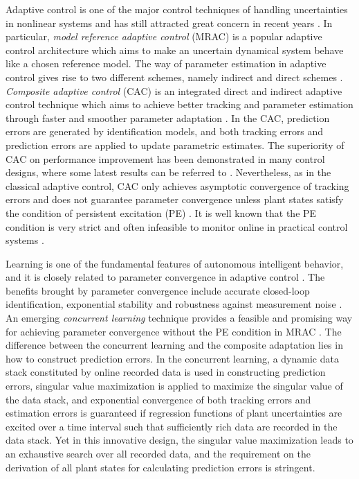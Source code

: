 \documentclass[conference]{IEEEtran}
\begin{document}
Adaptive control is one of the major control techniques of handling uncertainties in nonlinear systems and has still attracted great concern in recent years \cite{Astrom2008, Astolfi2008, Anderson2008, Stefanovic2011, Narendra2011, Casavola2012, Khan2012, Martin2012, Pathak2012, Lavretsky2013, Serrani2013, Sun2013, Barkana2014b, Chan2014, Swarnkar2014, Tao2014}. In particular, \emph{model reference adaptive control} (MRAC) is a popular adaptive control architecture which aims to make an uncertain dynamical system behave like a chosen reference model. The way of parameter estimation in adaptive control gives rise to two different schemes, namely indirect and direct schemes \cite{Ioannou1996}. \emph{Composite adaptive control} (CAC) is an integrated direct and indirect adaptive control technique which aims to achieve better tracking and parameter estimation through faster and smoother parameter adaptation \cite{Slotine1989}. In the CAC, prediction errors are generated by identification models, and both tracking errors and prediction errors are applied to update parametric estimates. The superiority of CAC on performance improvement has been demonstrated in many control designs, where some latest results can be referred to \cite{Naso2010, Patre2010, Hu2010, Mohanty2011, Pan2012, Pan2013b, Wei2013, Dydek2013}. Nevertheless, as in the classical adaptive control, CAC only achieves asymptotic convergence of tracking errors and does not guarantee parameter convergence unless plant states satisfy the condition of persistent excitation (PE) \cite{Ioannou1996}. It is well known that the PE condition is very strict and often infeasible to monitor online in practical control systems \cite{Chowdhary2010a}.

Learning is one of the fundamental features of autonomous intelligent behavior, and it is closely related to parameter convergence in adaptive control \cite{Antsaklis1995}. The benefits brought by parameter convergence include accurate closed-loop identification, exponential stability and robustness against measurement noise \cite{Chowdhary2014}. An emerging \emph{concurrent learning} technique provides a feasible and promising way for achieving parameter convergence without the PE condition in MRAC \cite{Chowdhary2010a, Chowdhary2011, Chowdhary2014}. The difference between the concurrent learning and the composite adaptation lies in how to construct prediction errors. In the concurrent learning, a dynamic data stack constituted by online recorded data is used in constructing prediction errors, singular value maximization is applied to maximize the singular value of the data stack, and exponential convergence of both tracking errors and estimation errors is guaranteed if regression functions of plant uncertainties are excited over a time interval such that sufficiently rich data are recorded in the data stack. Yet in this innovative design, the singular value maximization leads to an exhaustive search over all recorded data, and the requirement on the derivation of all plant states for calculating prediction errors is stringent.
\end{document}
